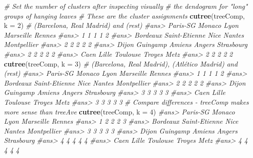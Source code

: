 \documentclass[]{book}
\newenvironment{Shaded}{\begin{snugshade}}{\end{snugshade}}
\newcommand{\KeywordTok}[1]{\textcolor[rgb]{0.13,0.29,0.53}{\textbf{#1}}}
\newcommand{\DataTypeTok}[1]{\textcolor[rgb]{0.13,0.29,0.53}{#1}}
\newcommand{\DecValTok}[1]{\textcolor[rgb]{0.00,0.00,0.81}{#1}}
\newcommand{\CommentTok}[1]{\textcolor[rgb]{0.56,0.35,0.01}{\textit{#1}}}
\newcommand{\NormalTok}[1]{#1}
\theoremstyle{definition}
\theoremstyle{definition}
\theoremstyle{definition}
\theoremstyle{remark}
\begin{document}
\begin{Shaded}
\begin{Highlighting}[]
\CommentTok{# Set the number of clusters after inspecting visually}
\CommentTok{# the dendogram for "long" groups of hanging leaves}
\CommentTok{# These are the cluster assignments}
\KeywordTok{cutree}\NormalTok{(treeComp, }\DataTypeTok{k =} \DecValTok{2}\NormalTok{) }\CommentTok{# (Barcelona, Real Madrid) and (rest)}
\CommentTok{#ans>      Paris-SG        Monaco          Lyon     Marseille        Rennes }
\CommentTok{#ans>             1             1             1             1             2 }
\CommentTok{#ans>      Bordeaux Saint-Etienne          Nice        Nantes   Montpellier }
\CommentTok{#ans>             2             2             2             2             2 }
\CommentTok{#ans>         Dijon      Guingamp        Amiens        Angers    Strasbourg }
\CommentTok{#ans>             2             2             2             2             2 }
\CommentTok{#ans>          Caen         Lille      Toulouse        Troyes          Metz }
\CommentTok{#ans>             2             2             2             2             2}
\KeywordTok{cutree}\NormalTok{(treeComp, }\DataTypeTok{k =} \DecValTok{3}\NormalTok{) }\CommentTok{# (Barcelona, Real Madrid), (Atlético Madrid) and (rest)}
\CommentTok{#ans>      Paris-SG        Monaco          Lyon     Marseille        Rennes }
\CommentTok{#ans>             1             1             1             1             2 }
\CommentTok{#ans>      Bordeaux Saint-Etienne          Nice        Nantes   Montpellier }
\CommentTok{#ans>             2             2             2             2             2 }
\CommentTok{#ans>         Dijon      Guingamp        Amiens        Angers    Strasbourg }
\CommentTok{#ans>             3             3             3             3             3 }
\CommentTok{#ans>          Caen         Lille      Toulouse        Troyes          Metz }
\CommentTok{#ans>             3             3             3             3             3}
\CommentTok{# Compare differences - treeComp makes more sense than treeAve}
\KeywordTok{cutree}\NormalTok{(treeComp, }\DataTypeTok{k =} \DecValTok{4}\NormalTok{) }
\CommentTok{#ans>      Paris-SG        Monaco          Lyon     Marseille        Rennes }
\CommentTok{#ans>             1             2             2             2             3 }
\CommentTok{#ans>      Bordeaux Saint-Etienne          Nice        Nantes   Montpellier }
\CommentTok{#ans>             3             3             3             3             3 }
\CommentTok{#ans>         Dijon      Guingamp        Amiens        Angers    Strasbourg }
\CommentTok{#ans>             4             4             4             4             4 }
\CommentTok{#ans>          Caen         Lille      Toulouse        Troyes          Metz }
\CommentTok{#ans>             4             4             4             4             4}
\end{Highlighting}
\end{Shaded}
\end{document}
